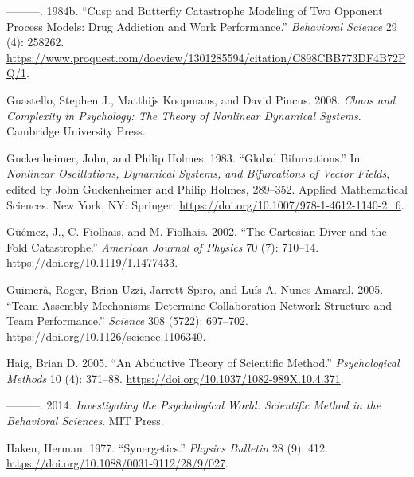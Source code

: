 \documentclass[
  a4paper,
  DIV=11,
  numbers=noendperiod]{scrreprt}
\newlength{\cslhangindent}
\newlength{\cslentryspacingunit} %
\newenvironment{CSLReferences}[2] %
 {%
  \setlength{\parindent}{0pt}
  \ifodd #1
  \let\oldpar\par
  \def\par{\hangindent=\cslhangindent\oldpar}
  \fi
  \setlength{\parskip}{#2\cslentryspacingunit}
 }%
 {}
\begin{document}
\begin{CSLReferences}{1}{0}
\leavevmode{}%
---------. 1984b. {``Cusp and Butterfly Catastrophe Modeling of Two
Opponent Process Models: Drug Addiction and Work Performance.''}
\emph{Behavioral Science} 29 (4): 258262.
\url{https://www.proquest.com/docview/1301285594/citation/C898CBB773DF4B72PQ/1}.

\leavevmode{}%
Guastello, Stephen J., Matthijs Koopmans, and David Pincus. 2008.
\emph{Chaos and {Complexity} in {Psychology}: {The Theory} of {Nonlinear
Dynamical Systems}}. {Cambridge University Press}.

\leavevmode{}%
Guckenheimer, John, and Philip Holmes. 1983. {``Global
{Bifurcations}.''} In \emph{Nonlinear {Oscillations}, {Dynamical
Systems}, and {Bifurcations} of {Vector Fields}}, edited by John
Guckenheimer and Philip Holmes, 289--352. Applied {Mathematical
Sciences}. {New York, NY}: {Springer}.
\url{https://doi.org/10.1007/978-1-4612-1140-2_6}.

\leavevmode{}%
Güémez, J., C. Fiolhais, and M. Fiolhais. 2002. {``The {Cartesian} Diver
and the Fold Catastrophe.''} \emph{American Journal of Physics} 70 (7):
710--14. \url{https://doi.org/10.1119/1.1477433}.

\leavevmode{}%
Guimerà, Roger, Brian Uzzi, Jarrett Spiro, and Luís A. Nunes Amaral.
2005. {``Team {Assembly Mechanisms Determine Collaboration Network
Structure} and {Team Performance}.''} \emph{Science} 308 (5722):
697--702. \url{https://doi.org/10.1126/science.1106340}.

\leavevmode{}%
Haig, Brian D. 2005. {``An Abductive Theory of Scientific Method.''}
\emph{Psychological Methods} 10 (4): 371--88.
\url{https://doi.org/10.1037/1082-989X.10.4.371}.

\leavevmode{}%
---------. 2014. \emph{Investigating the {Psychological World}:
{Scientific Method} in the {Behavioral Sciences}}. {MIT Press}.

\leavevmode{}%
Haken, Herman. 1977. {``Synergetics.''} \emph{Physics Bulletin} 28 (9):
412. \url{https://doi.org/10.1088/0031-9112/28/9/027}.


\end{CSLReferences}
\end{document}
